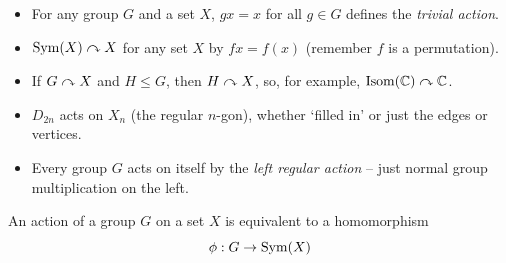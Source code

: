 \documentclass{../template/note}
\begin{document}
    \begin{example*}
        \begin{itemize}
            \item For any group \(G\) and a set \(X\), \(gx = x\) for all \(g \in G\) defines the \emph{trivial action}.
            \item \(\operatorname{Sym}(X) \curvearrowright X\) for any set \(X\) by \(fx = f(x)\) (remember \(f\) is a permutation).
            \item If \(G \curvearrowright X\) and \(H \leq G\), then \(H \curvearrowright X\), so, for example, \(\operatorname{Isom}(\mathbb C) \curvearrowright \mathbb C\).
            \item \(D_{2n}\) acts on \(X_n\) (the regular \(n\)-gon), whether `filled in' or just the edges or vertices.
            \item Every group \(G\) acts on itself by the \emph{left regular action} -- just normal group multiplication on the left.           
        \end{itemize}
        
        
    \end{example*}
    
    \begin{theorem}
        \label{actions-are-homomorphisms}
        An action of a group \(G\) on a set \(X\) is equivalent to a homomorphism
        \[
            \phi: G \to \operatorname{Sym}(X)
        \]
    \end{theorem}
    
\end{document}
